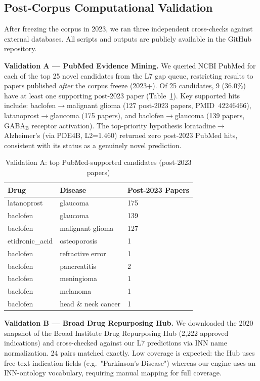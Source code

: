 \documentclass[11pt]{article}
\begin{document}
\subsection{Post-Corpus Computational Validation}
\label{sec:external-validation}

After freezing the corpus in 2023, we ran three independent
cross-checks against external databases. All scripts and outputs
are publicly available in the GitHub repository.

\textbf{Validation A — PubMed Evidence Mining.}
We queried NCBI PubMed for each of the top 25 novel candidates
from the L7 gap queue, restricting results to papers published
\emph{after} the corpus freeze (2023+).
Of 25 candidates, 9 (36.0\%) have at least one supporting
post-2023 paper (Table~\ref{tab:pubmed-hits}).
Key supported hits include:
baclofen$\to$malignant glioma (127 post-2023 papers,
PMID~42246466), latanoprost$\to$glaucoma (175 papers),
and baclofen$\to$glaucoma (139 papers, GABA$_\mathrm{B}$
receptor activation).
The top-priority hypothesis loratadine$\to$Alzheimer's
(via PDE4B, L2=1.460) returned zero post-2023 PubMed hits,
consistent with its status as a genuinely novel prediction.

\begin{table}[h]
\centering
\caption{Validation A: top PubMed-supported candidates (post-2023 papers)}
\label{tab:pubmed-hits}
\begin{tabular}{lll}
\hline
Drug & Disease & Post-2023 Papers \\
\hline
latanoprost & glaucoma & 175 \\
baclofen & glaucoma & 139 \\
baclofen & malignant glioma & 127 \\
etidronic\_acid & osteoporosis & 1 \\
baclofen & refractive error & 1 \\
baclofen & pancreatitis & 2 \\
baclofen & meningioma & 1 \\
baclofen & melanoma & 1 \\
baclofen & head \& neck cancer & 1 \\
\hline
\end{tabular}
\end{table}

\textbf{Validation B — Broad Drug Repurposing Hub.}
We downloaded the 2020 snapshot of the Broad Institute Drug
Repurposing Hub (2,222 approved indications) and cross-checked
against our L7 predictions via INN name normalization.
24 pairs matched exactly. Low coverage is expected: the Hub
uses free-text indication fields (e.g.\ "Parkinson's Disease")
whereas our engine uses an INN-ontology vocabulary, requiring
manual mapping for full coverage.
\end{document}
